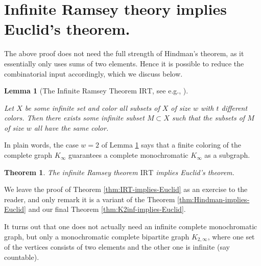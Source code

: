 \documentclass[12pt]{article}
\theoremstyle{theorem}
\newtheorem{theorem}{Theorem}
\newtheorem{lemma}{Lemma}
\theoremstyle{definition}
\newcommand{\IRT}{\mathrm{IRT}}
\begin{document}
\section{Infinite Ramsey theory implies Euclid's theorem.}
{\label{sec:IRT}}
The above proof does not need the full strength of Hindman's theorem, as
it essentially only uses sums of two elements.
Hence it is possible to reduce the combinatorial input accordingly, which we
discuss below.
\begin{lemma}[The Infinite Ramsey Theorem $\IRT$, see 
e.g., {\cite[Theorem 9.1.2]{Diestel}}]\label{lemma:IRT}

Let $X$ be some infinite set and color all subsets of $X$ of size $w$
with $t$ different colors. Then there exists some infinite subset
$M\subset X$ such that the subsets of $M$ of size $w$ all have the same color.
\end{lemma}
In plain words, the case $w=2$ of Lemma \ref{lemma:IRT}
says that a finite coloring of the complete
graph $K_{\infty}$ guarantees a complete monochromatic $K_{\infty}$ as a
subgraph.
\begin{theorem}{\label{thm:IRT-implies-Euclid}}
The infinite Ramsey theorem $\IRT$ implies Euclid's theorem.
\end{theorem}
We leave the proof of Theorem \ref{thm:IRT-implies-Euclid}
as an exercise to the reader, and only
remark it is a variant of the Theorem
{\ref{thm:Hindman-implies-Euclid}} and our final Theorem
{\ref{thm:K2inf-implies-Euclid}}.

It turns out that one does not actually need an
infinite complete monochromatic graph, but only
a monochromatic complete bipartite graph $K_{2, \infty}$,
where one set of the vertices 
consists of two elements and the other one is infinite (say countable).
\end{document}
